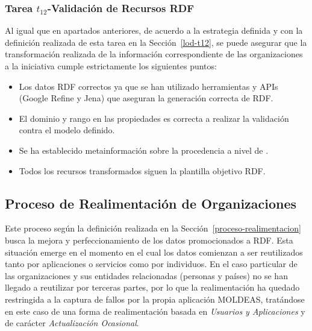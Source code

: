 \subsubsection{Tarea $t_{12}$-Validación de Recursos RDF}
Al igual que en apartados anteriores, de acuerdo a la estrategia definida y con la definición realizada de esta tarea en la Sección~\ref{lod-t12}, 
se puede asegurar que la transformación realizada de la información correspondiente de las organizaciones a la iniciativa \linkeddata cumple estrictamente los 
siguientes puntos:

\begin{itemize}
 \item Los datos \gls{RDF} correctos ya que se han utilizado herramientas y \gls{API}s (Google \gls{Refine} y Jena) que aseguran 
la generación correcta de RDF.
 \item El dominio y rango en las propiedades es correcta a realizar la validación contra el modelo definido.
 \item Se ha establecido metainformación sobre la procedencia a nivel de \dataset.
 \item Todos los recursos transformados siguen la plantilla objetivo RDF.
\end{itemize}

\subsection{Proceso de Realimentación de Organizaciones}
Este proceso según la definición realizada en la Sección~\ref{proceso-realimentacion} busca la mejora 
y perfeccionamiento de los datos promocionados a RDF. Esta situación emerge en el momento en el cual 
los datos comienzan a ser reutilizados tanto por aplicaciones o servicios como por individuos. En el caso 
particular de las organizaciones y sus entidades relacionadas (personas y países) no se han llegado 
a reutilizar por terceras partes, por lo que la realimentación ha quedado restringida a la captura 
de fallos por la propia aplicación \gls{MOLDEAS}, tratándose en este caso de una forma de realimentación 
basada en \textit{Usuarios y Aplicaciones} y de carácter \textit{Actualización Ocasional}.

